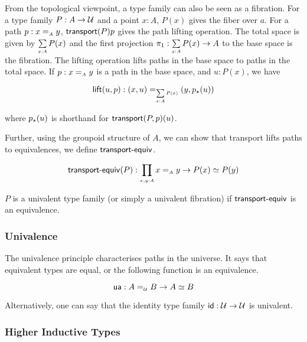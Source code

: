 From the topological viewpoint, a type family can also be seen as a fibration. For a type family $P : A \to \mathcal{U}$ and a
point $x : A$, $P(x)$ gives the fiber over $a$. For a path $p : x \id_{A} y$, $\operatorname{\mathsf{transport}}({P}){p}$ gives the path lifting
operation. The total space is given by $\dsum{x:A}{P(x)}$ and the first projection $\pi_1 : \dsum{x:A}{P(x)} \to A$ to
the base space is the fibration. The lifting operation lifts paths in the base space to paths in the total space. If
$p : x \id_{A} y$ is a path in the base space, and $u : P(x)$, we have

\[
  \term{lift}(u,p) : (x , u) \id_{\dsum{x:A}{P(x)}} (y , \tr{p}{u})
\]

where ${p}_{\star}({u})$ is shorthand for $\operatorname{\mathsf{transport}}({P,p})(u)$.

Further, using the groupoid structure of $A$, we can show that transport lifts paths to equivalences, we define
$\operatorname{\mathsf{transport-equiv}}$.

\[
  \term{transport-equiv}(P) : \dfun{x,y:A}{x \id_{A} y \to P(x) \eqv P(y)}
\]

\begin{definition}
  $P$ is a univalent type family (or simply a univalent fibration) if
  $\operatorname{\mathsf{transport-equiv}}$ is an equivalence.
\end{definition}

\subsubsection{Univalence}

The univalence principle characterises paths in the universe. It says that equivalent types are equal, or the following
function is an equivalence.

\[
  \ua : A \id_{\UU} B \to A \eqv B
\]

Alternatively, one can say that the identity type family $\operatorname{\mathsf{id}} : \mathcal{U} \to \mathcal{U}$ is univalent.

\subsubsection{Higher Inductive Types}

